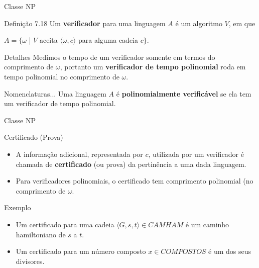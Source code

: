\documentclass[xcolor=dvipsnames,table]{beamer}
\begin{document}
	\begin{frame}{Classe NP}
		\begin{block}{Definição 7.18}
			Um {\bf verificador} para uma linguagem $A$ é um algoritmo $V$, em que
			\begin{center}
				$A = \{ \omega$ | $V$ aceita $\langle \omega, c \rangle$ para alguma cadeia $c \}$.
			\end{center}
		\end{block} \pause
		\begin{block}{Detalhes}
			Medimos o tempo de um verificador somente em termos do comprimento de $\omega$, portanto um {\bf verificador de tempo polinomial} roda em tempo polinomial no comprimento de $\omega$. 
		\end{block} \pause
		\begin{block}{Nomenclaturas...}
			Uma linguagem $A$ é {\bf polinomialmente verificável} se ela tem um verificador de tempo polinomial.
		\end{block}
	\end{frame}		
	
	\begin{frame}{Classe NP}
		\begin{block}{Certificado (Prova)}
			\begin{itemize}
				\item A informação adicional, representada por $c$, utilizada por um verificador é chamada de {\bf certificado} (ou prova) da pertinência a uma dada linguagem. \pause
				\item Para verificadores polinomiais, o certificado tem comprimento polinomial (no comprimento de $\omega$.
			\end{itemize}
		\end{block} \pause
		\begin{block}{Exemplo}
			\begin{itemize}
				\item Um certificado para uma cadeia $\langle G, s, t \rangle \in CAMHAM$ é um caminho hamiltoniano de $s$ a $t$. \pause
				\item Um certificado para um número composto $x \in COMPOSTOS $ é um dos seus divisores.
			\end{itemize}
		\end{block}
	\end{frame}
	
\end{document}
